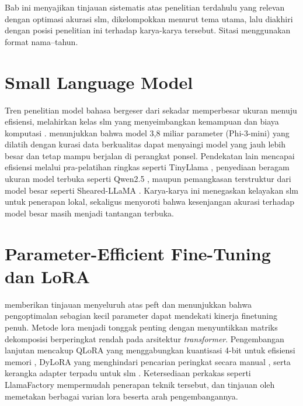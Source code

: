 Bab ini menyajikan tinjauan sistematis atas penelitian terdahulu yang relevan dengan optimasi akurasi \gls{slm}, dikelompokkan menurut tema utama, lalu diakhiri dengan posisi penelitian ini terhadap karya-karya tersebut. Sitasi menggunakan format nama--tahun.

\section{Small Language Model}
Tren penelitian model bahasa bergeser dari sekadar memperbesar ukuran menuju efisiensi, melahirkan kelas \gls{slm} yang menyeimbangkan kemampuan dan biaya komputasi \citep{wang2025slmsurvey}. \citet{abdin2024phi3} menunjukkan bahwa model 3,8 miliar parameter (Phi-3-mini) yang dilatih dengan kurasi data berkualitas dapat menyaingi model yang jauh lebih besar dan tetap mampu berjalan di perangkat ponsel. Pendekatan lain mencapai efisiensi melalui pra-pelatihan ringkas seperti TinyLlama \citep{zhang2024tinyllama}, penyediaan beragam ukuran model terbuka seperti Qwen2.5 \citep{qwen2024qwen25}, maupun pemangkasan terstruktur dari model besar seperti Sheared-LLaMA \citep{xia2023sheared}. Karya-karya ini menegaskan kelayakan \gls{slm} untuk penerapan lokal, sekaligus menyoroti bahwa kesenjangan akurasi terhadap model besar masih menjadi tantangan terbuka.

\section{Parameter-Efficient Fine-Tuning dan LoRA}
\citet{ding2023delta} memberikan tinjauan menyeluruh atas \gls{peft} dan menunjukkan bahwa pengoptimalan sebagian kecil parameter dapat mendekati kinerja \gls{finetuning} penuh. Metode \gls{lora} \citep{hu2022lora} menjadi tonggak penting dengan menyuntikkan matriks dekomposisi berperingkat rendah pada arsitektur \textit{transformer}. Pengembangan lanjutan mencakup QLoRA yang menggabungkan kuantisasi 4-bit untuk efisiensi memori \citep{dettmers2023qlora}, DyLoRA yang menghindari pencarian peringkat secara manual \citep{valipour2023dylora}, serta kerangka adapter terpadu untuk \gls{slm} \citep{hu2023llmadapters}. Ketersediaan perkakas seperti LlamaFactory \citep{zheng2024llamafactory} mempermudah penerapan teknik tersebut, dan tinjauan oleh \citet{mao2024lorasurvey} memetakan berbagai varian \gls{lora} beserta arah pengembangannya.

